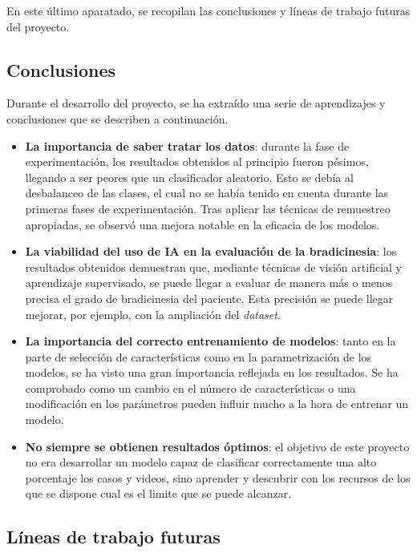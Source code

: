 
En este último aparatado, se recopilan las conclusiones y líneas de trabajo futuras del proyecto.

\subsection{Conclusiones}

Durante el desarrollo del proyecto, se ha extraído una serie de aprendizajes y conclusiones que se describen a continuación. 
\begin{itemize}


\item \textbf{La importancia de saber tratar los datos}: durante la fase de experimentación, los resultados obtenidos al principio fueron pésimos, llegando a ser peores que un clasificador aleatorio. Esto se debía al desbalanceo de las clases, el cual no se había tenido en cuenta durante las primeras fases de experimentación. Tras aplicar las técnicas de remuestreo apropiadas, se observó una mejora notable en la eficacia de los modelos.

\item \textbf{La viabilidad del uso de IA en la evaluación de la bradicinesia}: los resultados obtenidos demuestran que, mediante técnicas de visión artificial y aprendizaje supervisado, se puede llegar a evaluar de manera más o menos precisa el grado de bradicinesia del paciente. Esta precisión se puede llegar mejorar, por ejemplo, con la ampliación del \textit{dataset}.

\item \textbf{La importancia del correcto entrenamiento de modelos}: tanto en la parte de selección de características como en la parametrización de los modelos, se ha visto una gran importancia reflejada en los resultados. Se ha comprobado como un cambio en el número de características o una modificación en los parámetros pueden influir mucho a la hora de entrenar un modelo.

\item \textbf{No siempre se obtienen resultados óptimos}: el objetivo de este proyecto no era desarrollar un modelo capaz de clasificar correctamente una alto porcentaje los casos y videos, sino aprender y descubrir con los recursos de los que se dispone cual es el limite que se puede alcanzar. 

\end{itemize}
\subsection{Líneas de trabajo futuras}

